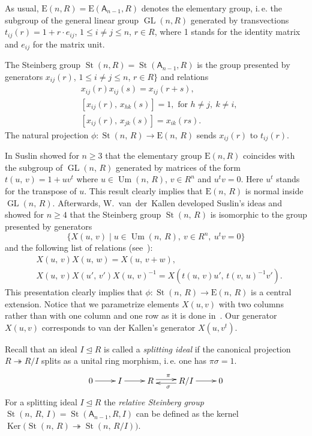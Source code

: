 \documentclass[11pt]{amsart}
\theoremstyle{plain} \declaretheorem[name=Theorem, Refname={Theorem,Theorems}]{tm} \Crefname{tm}{Theorem}{Theorems}
\numberwithin{equation}{section}
\theoremstyle{definition} \newtheorem{df}[lm]{Definition} \Crefname{df}{Definition}{Definitions}
\theoremstyle{remark} \newtheorem{rk}[lm]{Remark} \Crefname{rk}{Remark}{Remarks}
\newcommand{\Ker}{\mathop{\mathrm{Ker}}\nolimits}
\newcommand{\E}{{\mathrm{E}}}
\newcommand{\Um}{\mathop{\mathrm{Um}}\nolimits}
\newcommand{\St}{\mathop{\mathrm{St}}\nolimits}
\newcommand{\GL}{\mathop{\mathrm{GL}}\nolimits}
\newcommand{\epi}{\twoheadrightarrow}
\newcommand{\inv}{^{-1}}
\newcommand{\rA}{\mathsf{A}}
\begin{document}
As usual, $\E(n, R)=\E(\rA_{n-1}, R)$ denotes the elementary group, i.\,e. the subgroup of the general linear group $\GL(n, R)$ generated by transvections
$t_{ij}(r)=1+r \cdot e_{ij}$, $1\leq i\neq j\leq n$, $r\in R$,
where 1 stands for the identity matrix and $e_{ij}$ for the matrix unit.

The Steinberg group $\St(n, R) = \St(\rA_{n-1}, R)$ is the group presented by generators
$x_{ij}(r)$, $1\leq i\neq j\leq n$, $r\in R\}$ and relations
\setcounter{equation}{0}
\renewcommand{\theequation}{S\arabic{equation}}
\begin{align}
&x_{ij}(r)x_{ij}(s)=x_{ij}(r+s), \label{add0}\\
&[x_{ij}(r),\,x_{hk}(s)]=1,\text{ for }h\neq j,\ k\neq i, \label{ccf1}\\
&[x_{ij}(r),\,x_{jk}(s)]=x_{ik}(rs) \label{ccf2}.
\end{align}
The natural projection $\phi\colon\St(n,\,R)\rightarrow\E(n,\,R)$ sends $x_{ij}(r)$ to $t_{ij}(r)$.

In \cite{Sus} Suslin showed for $n\geq 3$ that the elementary group $\E(n, R)$ coincides with the subgroup of $\GL(n,\,R)$ generated by matrices
of the form $t(u,\,v)=1+uv^t$ where $u\in\Um(n,\,R)$, $v\in R^n$ and $u^tv=0$. Here $u^t$ stands for the transpose of $u$.
This result clearly implies that $\E(n,\,R)$ is normal inside $\GL(n,\,R)$.
Afterwards, W.~van~der~Kallen developed Suslin's ideas and showed for $n\geq4$ that the Steinberg group $\St(n,\,R)$ is isomorphic to the group presented by generators
$$\{X(u,\,v)\mid u\in\Um(n,\,R),\ v\in R^n,\ u^tv=0\}$$ and the following list of relations (see~\cite[Theorem~1]{vdK}):
\setcounter{equation}{0} \renewcommand{\theequation}{K\arabic{equation}}
\begin{align}
&X(u,\,v)X(u,\,w)=X(u,\,v+w), \label{add1} \\
&X(u,\,v)X(u',\,v')X(u,\,v)\inv=X(t(u,\,v)u',\,t(v,\,u)\inv v'). \label{conj1}
\end{align}
This presentation clearly implies that $\phi\colon\St(n,\,R)\rightarrow\E(n,\,R)$ is a central extension.
Notice that we parametrize elements $X(u, v)$ with two columns rather than with one column and one row as it is done in~\cite{vdK}.
Our generator $X(u,v)$ corresponds to van der Kallen's generator $X(u, v^t)$.

Recall that an ideal $I\trianglelefteq R$ is called a \emph{splitting ideal} if the canonical projection $R \twoheadrightarrow R/I$ splits as a unital ring morphism, i.\,e. one has $\pi\sigma=1$.
$$\xymatrix{0\ar@<0.1ex>[r]^{}&I\ar@<0.1ex>[r]^{}&R\ar@<0.5ex>[r]^{\pi}&R/I\ar@<0.5ex>[l]^{\sigma}\ar@<0.1ex>[r]^{}&0}$$
For a splitting ideal $I\trianglelefteq R$ the \emph{relative Steinberg group} $\St(n,\,R,\,I) = \St(\rA_{n-1}, R, I)$ can be defined as the kernel $\Ker\big(\St(n,\,R)\epi\St(n,\,R/I)\big)$.
\end{document}
